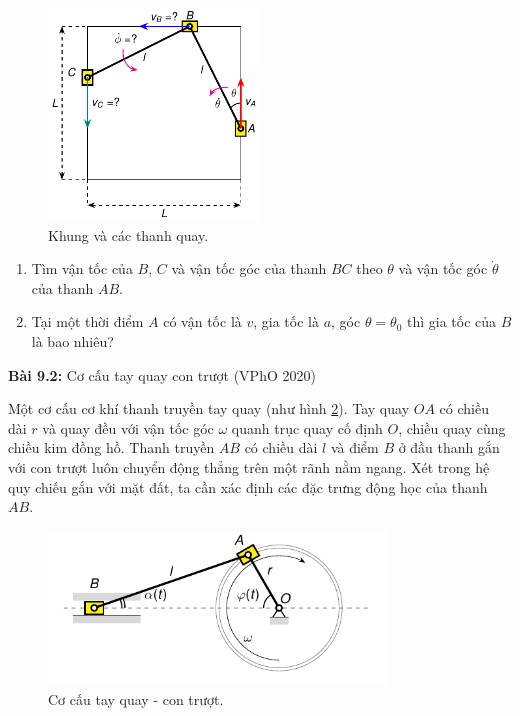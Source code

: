 \begin{figure}[!h]
    \centering
    \includegraphics[width=0.5\textwidth]{Tuan9/Figures/Fig_P9_1/Fig_P9_1.pdf}
    \caption{Khung và các thanh quay.}
    \label{fig:9_P1}
\end{figure}

\begin{enumerate}
    \item Tìm vận tốc của \(B\), \(C\) và vận tốc góc của thanh \(BC\) theo \(\theta\) và vận tốc góc \(\dot{\theta}\) của thanh \(AB\).
    \item Tại một thời điểm \(A\) có vận tốc là \(v\), gia tốc là \(a\), góc \(\theta=\theta_0\) thì gia tốc của \(B\) là bao nhiêu?
\end{enumerate}

\textbf{Bài 9.2:} Cơ cấu tay quay con trượt (VPhO 2020)

Một cơ cấu cơ khí thanh truyền tay quay (như hình \ref{fig:9_P2}). 
Tay quay \(OA\) có chiều dài \(r\) và quay đều với vận tốc góc \(\omega\) quanh trục quay cố định \(O\), chiều quay cùng chiều kim đồng hồ. 
Thanh truyền \(AB\) có chiều dài \(l\) và điểm \(B\) ở đầu thanh gắn với con trượt luôn chuyển động thẳng trên một rãnh nằm ngang. 
Xét trong hệ quy chiếu gắn với mặt đất, ta cần xác định các đặc trưng động học của thanh \(AB\).

\begin{figure}[!h]
    \centering
    \includegraphics[width=0.8\textwidth]{Tuan9/Figures/Fig_P9_2/Fig_P9_2.pdf}
    \caption{Cơ cấu tay quay - con trượt.}
    \label{fig:9_P2}
\end{figure}

